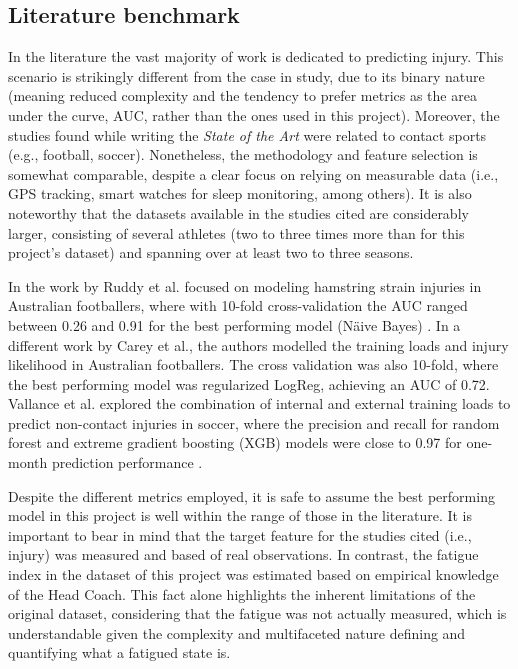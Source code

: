 \documentclass[conference]{IEEEtran}
\begin{document}
\subsection{Literature benchmark}

In the literature the vast majority of work is dedicated to predicting injury. This scenario is strikingly different from the case in study, due to its binary nature (meaning reduced complexity and the tendency to prefer metrics as the area under the curve, AUC, rather than the ones used in this project). Moreover, the studies found while writing the \textit{State of the Art} were related to contact sports (e.g., football, soccer). Nonetheless, the methodology and feature selection is somewhat comparable, despite a clear focus on relying on measurable data (i.e., GPS tracking, smart watches for sleep monitoring, among others). It is also noteworthy that the datasets available in the studies cited are considerably larger, consisting of several athletes (two to three times more than for this project's dataset) and spanning over at least two to three seasons. 

In the work by Ruddy et al. focused on modeling hamstring strain injuries in Australian footballers, where with 10-fold cross-validation the AUC ranged between 0.26 and 0.91 for the best performing model (Näive Bayes) \cite{ruddy2018predictive}. In a different work by Carey et al., the authors modelled the training loads and injury likelihood in Australian footballers. The cross validation was also 10-fold, where the best performing model was regularized LogReg, achieving an AUC of 0.72. Vallance et al. explored the combination of internal and external training loads to predict non-contact injuries in soccer, where the precision and recall for random forest and extreme gradient boosting (XGB) models were close to 0.97 for one-month prediction performance \cite{Carey_2018}.

Despite the different metrics employed, it is safe to assume the best performing model in this project is well within the range of those in the literature. It is important to bear in mind that the target feature for the studies cited (i.e., injury) was measured and based of real observations. In contrast, the fatigue index in the dataset of this project was estimated based on empirical knowledge of the Head Coach. This fact alone highlights the inherent limitations of the original dataset, considering that the fatigue was not actually measured, which is understandable given the complexity and multifaceted nature defining and quantifying what a fatigued state is.
\end{document}
